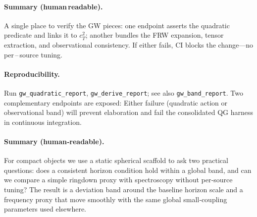 \documentclass[aps,prd,twocolumn,superscriptaddress,nofootinbib,floatfix,longbibliography]{revtex4-2}
\newcommand{\lean}[1]{\texttt{\detokenize{#1}}}
\begin{document}
\paragraph*{Summary (human\,readable).}
A single place to verify the GW pieces: one endpoint asserts the quadratic predicate and links it to $c_T^2$; another bundles the FRW expansion, tensor extraction, and observational consistency. If either fails, CI blocks the change—no per\,–\,source tuning.
\paragraph*{Reproducibility.}
Run \texttt{gw\_quadratic\_report}, \texttt{gw\_derive\_report}; see also \texttt{gw\_band\_report}.
Two complementary endpoints are exposed:
Either failure (quadratic action or observational band) will prevent elaboration and fail the consolidated QG harness in continuous integration.
%
%
%
\paragraph*{Summary (human‑readable).}
For compact objects we use a static spherical scaffold to ask two practical questions: does a consistent horizon condition hold within a global band, and can we compare a simple ringdown proxy with spectroscopy without per‑source tuning? The result is a deviation band around the baseline horizon scale and a frequency proxy that move smoothly with the same global small‑coupling parameters used elsewhere.
\end{document}
